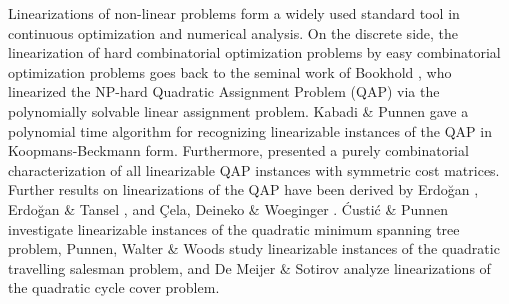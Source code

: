\documentclass[11pt,fleqn]{article}
\begin{document}
Linearizations of non-linear problems form a widely used standard tool in continuous 
optimization and numerical analysis.
On the discrete side, the linearization of hard combinatorial optimization problems by easy 
combinatorial optimization problems goes back to the seminal work of Bookhold \cite{Bo1990}, 
who linearized the NP-hard Quadratic Assignment Problem (QAP) via the polynomially solvable 
linear assignment problem.
Kabadi \& Punnen \cite{KaPu2011,PuKa2013} gave a polynomial time algorithm for recognizing 
linearizable instances of the QAP in Koopmans-Beckmann form.
Furthermore, \cite{PuKa2013} presented a purely combinatorial characterization of all linearizable
QAP instances with symmetric cost matrices.
Further results on linearizations of the QAP have been derived by
Erdo\u{g}an \cite{Erdogan2006}, Erdo\u{g}an \& Tansel \cite{ErTa2007,ErTa2011}, and 
\c{C}ela, Deineko \& Woeginger \cite{CeDeWo2016}.
{\'C}usti{\'c} \& Punnen \cite{CuPu2016} investigate linearizable instances of the quadratic minimum spanning tree problem,
Punnen, Walter \& Woods \cite{PuWaWo2013} study linearizable instances of the quadratic travelling salesman problem, and
De Meijer \& Sotirov \cite{deMeSo2020} analyze linearizations of the quadratic cycle cover problem.
\end{document}
